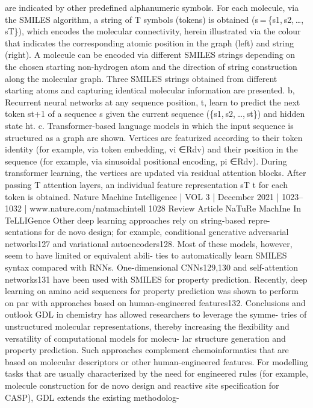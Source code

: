 are indicated by other predefined alphanumeric symbols. For each molecule, via the SMILES algorithm, a string of T symbols (tokens) is obtained
(s = \{s1, s2, …, sT\}), which encodes the molecular connectivity, herein illustrated via the colour that indicates the corresponding atomic position in the graph
(left) and string (right). A molecule can be encoded via different SMILES strings depending on the chosen starting non-hydrogen atom and the direction of
string construction along the molecular graph. Three SMILES strings obtained from different starting atoms and capturing identical molecular information
are presented. b, Recurrent neural networks at any sequence position, t, learn to predict the next token st+1 of a sequence s given the current sequence
(\{s1, s2, …, st\}) and hidden state ht. c. Transformer-based language models in which the input sequence is structured as a graph are shown. Vertices are
featurized according to their token identity (for example, via token embedding, vi ∈Rdv) and their position in the sequence (for example, via sinusoidal
positional encoding, pi ∈Rdv). During transformer learning, the vertices are updated via residual attention blocks. After passing T attention layers, an
individual feature representation sT
t  for each token is obtained.
Nature Machine Intelligence | VOL 3 | December 2021 | 1023–1032 | www.nature.com/natmachintell
1028
Review Article
NaTuRe MachIne In TeLLIGence
Other deep learning approaches rely on string-based repre-
sentations for de novo design; for example, conditional generative
adversarial networks127 and variational autoencoders128. Most of
these models, however, seem to have limited or equivalent abili-
ties to automatically learn SMILES syntax compared with RNNs.
One-dimensional CNNs129,130 and self-attention networks131 have
been used with SMILES for property prediction. Recently, deep
learning on amino acid sequences for property prediction was shown
to perform on par with approaches based on human-engineered
features132.
Conclusions and outlook
GDL in chemistry has allowed researchers to leverage the symme-
tries of unstructured molecular representations, thereby increasing
the flexibility and versatility of computational models for molecu-
lar structure generation and property prediction. Such approaches
complement chemoinformatics that are based on molecular
descriptors or other human-engineered features. For modelling
tasks that are usually characterized by the need for engineered rules
(for example, molecule construction for de novo design and reactive
site specification for CASP), GDL extends the existing methodolog-
